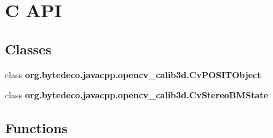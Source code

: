 \hypertarget{group__calib3d__c}{}\section{C A\+PI}
\label{group__calib3d__c}
\subsection*{Classes}
\begin{DoxyCompactItemize}
\item 
class {\bfseries org.\+bytedeco.\+javacpp.\+opencv\+\_\+calib3d.\+Cv\+P\+O\+S\+I\+T\+Object}
\item 
class {\bfseries org.\+bytedeco.\+javacpp.\+opencv\+\_\+calib3d.\+Cv\+Stereo\+B\+M\+State}
\end{DoxyCompactItemize}
\subsection*{Functions}
